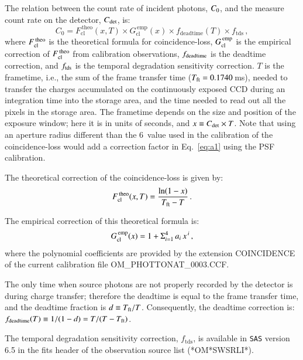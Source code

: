 \documentclass{aa}
\begin{document}
The relation between the count rate of incident photons, $C_{\rm 0}$,
and the measure count rate on the detector, $C_{\rm det}$, is:
\begin{equation}
\label{eq:a1}
C_\mathrm{0}=F^\mathrm{\, theo}_\mathrm{ cl}(x,T)\times
G^\mathrm{ \,emp}_\mathrm{ cl}(x) \times f_\mathrm{ deadtime}(T) \times
f_\mathrm{tds}\,, 
\end{equation}
where $F^{\rm \,theo}_{\rm cl}$ is the theoretical formula for
coincidence-loss, $G^{\rm \,emp}_{\rm cl}$ is the
empirical correction of $F^{\rm\, theo}_{\rm cl}$ from
calibration observations, $f_{\rm deadtime}$ is the deadtime correction, and
$f_{\rm tds}$ is the temporal degradation sensitivity correction.  
$T$ is the frametime, i.e., the sum of the frame transfer time ($T_{\rm
ft}=0.1740$\,ms), needed to transfer the charges accumulated on the
continuously exposed CCD during an integration time into the storage
area, and the time needed to read out all the pixels in the storage
area. The frametime depends on the size and position of the exposure
window; here it is in units of seconds, and $x \equiv C_{\rm det}
\times T $. Note that using an aperture radius different than the
6\arcsec~value used in the calibration of the coincidence-loss would
add a correction factor in Eq.~\ref{eq:a1} using the PSF calibration.

The theoretical correction of the coincidence-loss
\citep[see][]{ehle05} is given by: 
\begin{equation}
F^{\rm\, theo}_{\rm cl}(x,T)= \frac{\ln (1-x)}{T_{\rm ft}-T}
\, .
\end{equation}

The empirical correction of this theoretical formula is:
\begin{equation}
G^{\rm \,emp}_{\rm cl}(x)=1+\Sigma_{i=1}^4 \, a_i \, x^{\,i} \, ,
\end{equation}
where the polynomial coefficients are provided by the extension COINCIDENCE of
the current calibration file OM\_PHOTTONAT\_0003.CCF. 

The only time when source photons are not properly recorded by
the detector is during charge transfer; therefore the deadtime is
equal to the frame transfer time, and the deadtime fraction is $d \equiv
T_{\rm ft}/T$. Consequently, the deadtime correction is: $f_{\rm
deadtime}(T) \equiv 1/(1-d)=T/(T-T_{\rm ft})$. 

The temporal degradation sensitivity correction, $f_\mathrm{tds}$, is
available in {\tt SAS} version 6.5 in the fits header of the observation
source list (*OM*SWSRLI*).
\end{document}
